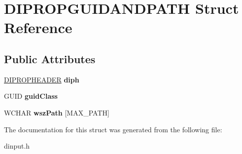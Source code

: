 \hypertarget{struct_d_i_p_r_o_p_g_u_i_d_a_n_d_p_a_t_h}{\section{D\-I\-P\-R\-O\-P\-G\-U\-I\-D\-A\-N\-D\-P\-A\-T\-H Struct Reference}
\label{struct_d_i_p_r_o_p_g_u_i_d_a_n_d_p_a_t_h}
}
\subsection*{Public Attributes}
\begin{DoxyCompactItemize}
\item 
\hypertarget{struct_d_i_p_r_o_p_g_u_i_d_a_n_d_p_a_t_h_a530542b2b1714295053dc827b8cecfdb}{\hyperlink{struct_d_i_p_r_o_p_h_e_a_d_e_r}{D\-I\-P\-R\-O\-P\-H\-E\-A\-D\-E\-R} {\bfseries diph}}\label{struct_d_i_p_r_o_p_g_u_i_d_a_n_d_p_a_t_h_a530542b2b1714295053dc827b8cecfdb}

\item 
\hypertarget{struct_d_i_p_r_o_p_g_u_i_d_a_n_d_p_a_t_h_aeb66a81b5887ee112e59b44c5403eee8}{G\-U\-I\-D {\bfseries guid\-Class}}\label{struct_d_i_p_r_o_p_g_u_i_d_a_n_d_p_a_t_h_aeb66a81b5887ee112e59b44c5403eee8}

\item 
\hypertarget{struct_d_i_p_r_o_p_g_u_i_d_a_n_d_p_a_t_h_a33104322e09953d31a7c9f5570fc0e70}{W\-C\-H\-A\-R {\bfseries wsz\-Path} \mbox{[}M\-A\-X\-\_\-\-P\-A\-T\-H\mbox{]}}\label{struct_d_i_p_r_o_p_g_u_i_d_a_n_d_p_a_t_h_a33104322e09953d31a7c9f5570fc0e70}

\end{DoxyCompactItemize}


The documentation for this struct was generated from the following file\-:\begin{DoxyCompactItemize}
\item 
dinput.\-h\end{DoxyCompactItemize}
